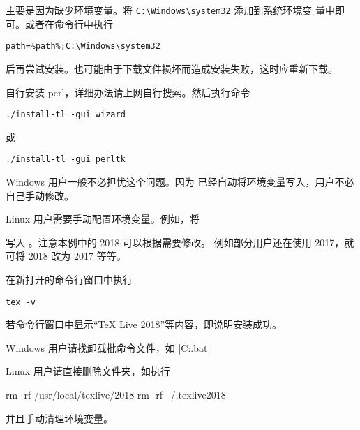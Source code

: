 
主要是因为缺少环境变量。将 \verb|C:\Windows\system32| 添加到系统环境变
量中即可。或者在命令行中执行
\begin{verbatim}
path=%path%;C:\Windows\system32
\end{verbatim}
后再尝试安装。也可能由于下载文件损坏而造成安装失败，这时应重新下载。



自行安装 perl，详细办法请上网自行搜索。然后执行命令
\begin{verbatim}
./install-tl -gui wizard
\end{verbatim}
或
\begin{verbatim}
./install-tl -gui perltk
\end{verbatim}



Windows 用户一般不必担忧这个问题。因为 \TeXLive{} 已经自动将环境变量写入，用户不必自己手动修改。

Linux 用户需要手动配置环境变量。例如，将
写入 。注意本例中的 2018 可以根据需要修改。
例如部分用户还在使用 \TeXLive{} 2017，就可将 2018 改为 2017 等等。



在新打开的命令行窗口中执行
\begin{verbatim}
tex -v
\end{verbatim}
若命令行窗口中显示“TeX Live 2018”等内容，即说明安装成功。



Windows 用户请找卸载批命令文件，如 |C:\texlive{}\tlpkg\installer\uninst.bat|

Linux 用户请直接删除文件夹，如执行
\begin{shcode}
  rm -rf /usr/local/texlive/2018
  rm -rf ~/.texlive2018
\end{shcode}
并且手动清理环境变量。


